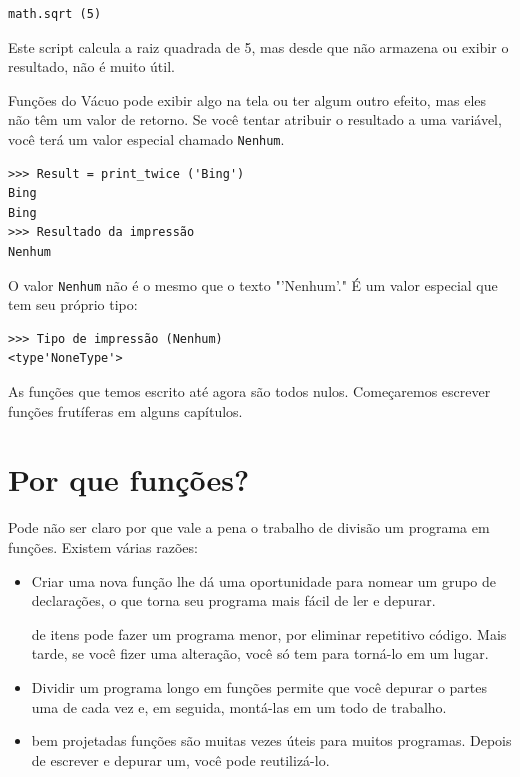 \documentclass[10pt]{book}
\begin{document}
\begin{verbatim}
math.sqrt (5)
\end{verbatim}
%
Este script calcula a raiz quadrada de 5, mas desde que não armazena
ou exibir o resultado, não é muito útil.

Funções do Vácuo pode exibir algo na tela ou ter algum
outro efeito, mas eles não têm um valor de retorno. Se você tentar
atribuir o resultado a uma variável, você terá um valor especial chamado
{\tt Nenhum}.

\begin{verbatim}
>>> Result = print_twice ('Bing')
Bing
Bing
>>> Resultado da impressão
Nenhum
\end{verbatim}
%
O valor {\tt Nenhum} não é o mesmo que o texto \verbo "'Nenhum'." 
É um valor especial que tem seu próprio tipo:

\begin{verbatim}
>>> Tipo de impressão (Nenhum)
<type'NoneType'>
\end{verbatim}
%
As funções que temos escrito até agora são todos nulos. Começaremos
escrever funções frutíferas em alguns capítulos.


\section{Por que funções?}

Pode não ser claro por que vale a pena o trabalho de divisão
um programa em funções. Existem várias razões:

\begin{itemize}

\item Criar uma nova função lhe dá uma oportunidade para nomear um grupo
de declarações, o que torna seu programa mais fácil de ler e depurar.

 de itens pode fazer um programa menor, por eliminar repetitivo
código. Mais tarde, se você fizer uma alteração, você só tem
para torná-lo em um lugar.

\item Dividir um programa longo em funções permite que você depurar o
partes uma de cada vez e, em seguida, montá-las em um todo de trabalho.

\item bem projetadas funções são muitas vezes úteis para muitos programas.
Depois de escrever e depurar um, você pode reutilizá-lo.

\end{itemize}
\end{document}
